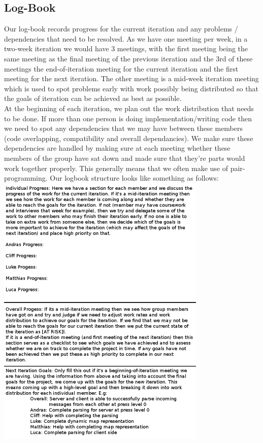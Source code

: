 \documentclass[11pt]{article}
\begin{document}
\subsection{Log-Book}
Our log-book records progress for the current iteration and any problems / 
dependencies that need to be resolved. As we have one meeting per week, in a 
two-week iteration we would have 3 meetings, with the first meeting being the 
same meeting as the final meeting of the previous iteration and the 3rd of these
meetings the end-of-iteration meeting for the current iteration and the first 
meeting for the next iteration. The other meeting is a mid-week iteration 
meeting which is used to spot problems early with work possibly being 
distributed so that the goals of iteration can be achieved as best as possible. 
\\
At the beginning of each iteration, we plan out the work distribution that needs
to be done. If more than one person is doing implementation/writing code then we
need to spot any dependencies that we may have between these members (code 
overlapping, compatibility and overall dependancies). We make sure these 
dependencies are handled by making sure at each meeting whether these members
of the group have sat down and made sure that they're parts would work together
properly. This generally means that we often make use of pair-programming. Our 
logbook structure looks like something as follows:
\\ 
\includegraphics[width=100mm]{logbooktemplate.png}
\end{document}
